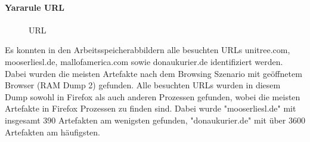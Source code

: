 \paragraph*{Yararule URL}
\begin{figure}[h!]
	\centerline{}
	\label{chart:final-criteria}  
	\caption{URL}
\end{figure}
Es konnten in den Arbeitsspeicherabbildern alle besuchten URLs unitree.com, mooserliesl.de, mallofamerica.com sowie donaukurier.de identifiziert werden.
Dabei wurden die meisten Artefakte nach dem Browsing Szenario mit geöffnetem Browser (RAM Dump 2) gefunden. Alle besuchten URLs wurden in diesem Dump sowohl in Firefox als auch anderen Prozessen gefunden, wobei die meisten Artefakte in Firefox Prozessen zu finden sind. Dabei wurde "mooserliesl.de" mit insgesamt 390 Artefakten am wenigsten gefunden, "donaukurier.de" mit über 3600 Artefakten am häufigsten.

